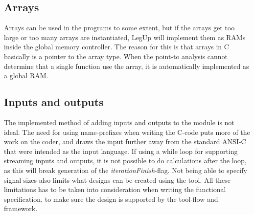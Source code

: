 \subsection{Arrays}
Arrays can be used in the programs to some extent, but if the arrays get too large or too many arrays are instantiated, LegUp will implement them as RAMs inside the global memory controller. The reason for this is that arrays in C basically is a pointer to the array type. When the point-to analysis cannot determine that a single function use the array, it is automatically implemented as a global RAM.
\subsection{Inputs and outputs}
The implemented method of adding inputs and outputs to the module is not ideal. The need for using name-prefixes when writing the C-code puts more of the work on the coder, and draws the input further away from the standard ANSI-C that were intended as the input language. If using a while loop for supporting streaming inputs and outputs, it is not possible to do calculations after the loop, as this will break generation of the \textit{iterationFinish}-flag. Not being able to specify signal sizes also limits what designs can be created using the tool. All these limitations has to be taken into consideration when writing the functional specification, to make sure the design is supported by the tool-flow and framework.